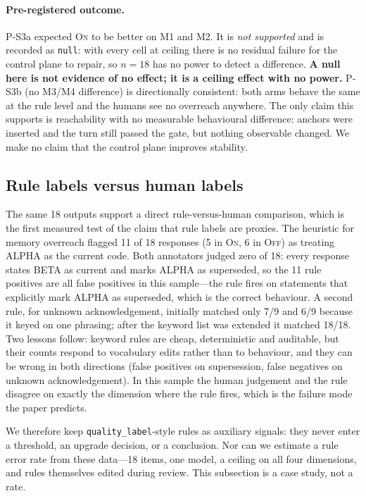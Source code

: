 \paragraph{Pre-registered outcome.} P-S3a expected \textsc{On} to be better on
M1 and M2. It is \emph{not supported} and is recorded as \texttt{null}: with
every cell at ceiling there is no residual failure for the control plane to
repair, so $n=18$ has no power to detect a difference. \textbf{A null here is
not evidence of no effect; it is a ceiling effect with no power.} P-S3b (no
M3/M4 difference) is directionally consistent: both arms behave the same at the
rule level and the humans see no overreach anywhere. The only claim this
supports is reachability with no measurable behavioural difference: anchors were
inserted and the turn still passed the gate, but nothing observable changed. We
make no claim that the control plane improves stability.

\subsection{Rule labels versus human labels}\label{sec:exp:s5}

The same 18 outputs support a direct rule-versus-human comparison, which is the
first measured test of the claim that rule labels are proxies. The heuristic for
memory overreach flagged 11 of 18 responses (5 in \textsc{On}, 6 in
\textsc{Off}) as treating ALPHA as the current code. Both annotators judged zero
of 18: every response states BETA as current and marks ALPHA as superseded, so
the 11 rule positives are all false positives in this sample---the rule fires on
statements that explicitly mark ALPHA as superseded, which is the correct
behaviour. A second rule, for
unknown acknowledgement, initially matched only 7/9 and 6/9 because it keyed on
one phrasing; after the keyword list was extended it matched 18/18. Two lessons
follow: keyword rules are cheap, deterministic and auditable, but their counts
respond to vocabulary edits rather than to behaviour, and they can be wrong in
both directions (false positives on supersession, false negatives on unknown
acknowledgement). In this sample the human judgement and the rule disagree on
exactly the dimension where the rule fires, which is the failure mode the paper
predicts.

We therefore keep \texttt{quality\_label}-style rules as auxiliary signals: they
never enter a threshold, an upgrade decision, or a conclusion. Nor can we
estimate a rule error rate from these data---18 items, one model, a ceiling on
all four dimensions, and rules themselves edited during review. This subsection
is a case study, not a rate.

